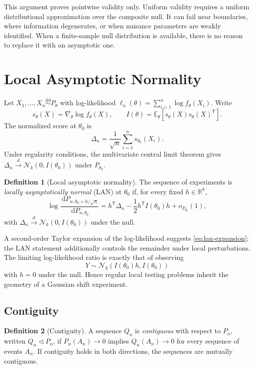 \documentclass[12pt,oneside]{book}
\numberwithin{equation}{section}
\theoremstyle{definition}
\newtheorem{definition}{Definition}[section]
\theoremstyle{plain}
\theoremstyle{remark}
\newcommand{\R}{\mathbb{R}}
\newcommand{\E}{\mathbb{E}}
\newcommand{\iid}{\overset{\text{iid}}{\sim}}
\newcommand{\convd}{\overset{d}{\to}}
\newcommand{\dd}{\,\mathrm{d}}
\newcommand{\grad}{\nabla}
\newcommand{\Normal}{\mathcal{N}}
\begin{document}
This argument proves pointwise validity only.  Uniform validity requires a
uniform distributional approximation over the composite null.  It can fail
near boundaries, where information degenerates, or when nuisance parameters
are weakly identified.  When a finite-sample null distribution is available,
there is no reason to replace it with an asymptotic one.

\section{Local Asymptotic Normality}

Let $X_1,\ldots,X_n\iid P_\theta$ with log-likelihood
$\ell_n(\theta)=\sum_{i=1}^n\log f_\theta(X_i)$.  Write
\[
    s_\theta(X)=\grad_\theta\log f_\theta(X),
    \qquad
    I(\theta)=\E_\theta[s_\theta(X)s_\theta(X)^\mathsf T].
\]
The normalized score at $\theta_0$ is
\[
    \Delta_n=\frac{1}{\sqrt n}\sum_{i=1}^n s_{\theta_0}(X_i).
\]
Under regularity conditions, the multivariate central limit theorem gives
$\Delta_n\convd\Normal_k(0,I(\theta_0))$ under $P_{\theta_0}$.

\begin{definition}[Local asymptotic normality]
The sequence of experiments is \emph{locally asymptotically normal} (LAN) at
$\theta_0$ if, for every fixed $h\in\R^k$,
\begin{equation}
 \log\frac{\dd P_{n,\theta_0+h/\sqrt n}}
              {\dd P_{n,\theta_0}}
 =h^\mathsf T\Delta_n
  -\frac12h^\mathsf TI(\theta_0)h+o_{P_{\theta_0}}(1),
 \label{eq:lan-expansion}
\end{equation}
with $\Delta_n\convd\Normal_k(0,I(\theta_0))$ under the null.
\end{definition}

A second-order Taylor expansion of the log-likelihood suggests
\eqref{eq:lan-expansion}; the LAN statement additionally controls the
remainder under local perturbations.  The limiting log-likelihood ratio is
exactly that of observing
\[
    Y\sim\Normal_k(I(\theta_0)h,I(\theta_0))
\]
with $h=0$ under the null.  Hence regular local testing problems inherit the
geometry of a Gaussian shift experiment.

\subsection{Contiguity}

\begin{definition}[Contiguity]
A sequence $Q_n$ is \emph{contiguous} with respect to $P_n$, written
$Q_n\triangleleft P_n$, if $P_n(A_n)\to0$ implies $Q_n(A_n)\to0$ for every
sequence of events $A_n$.  If contiguity holds in both directions, the
sequences are mutually contiguous.
\end{definition}
\end{document}

